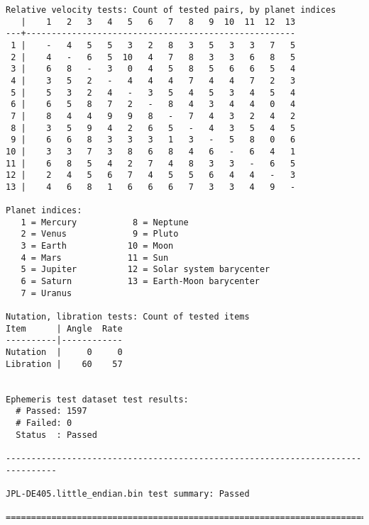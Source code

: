 \begin{description}
\begin{verbatim}
Relative velocity tests: Count of tested pairs, by planet indices
   |    1   2   3   4   5   6   7   8   9  10  11  12  13
---+-----------------------------------------------------
 1 |    -   4   5   5   3   2   8   3   5   3   3   7   5
 2 |    4   -   6   5  10   4   7   8   3   3   6   8   5
 3 |    6   8   -   3   0   4   5   8   5   6   6   5   4
 4 |    3   5   2   -   4   4   4   7   4   4   7   2   3
 5 |    5   3   2   4   -   3   5   4   5   3   4   5   4
 6 |    6   5   8   7   2   -   8   4   3   4   4   0   4
 7 |    8   4   4   9   9   8   -   7   4   3   2   4   2
 8 |    3   5   9   4   2   6   5   -   4   3   5   4   5
 9 |    6   6   8   3   3   3   1   3   -   5   8   0   6
10 |    3   3   7   3   8   6   8   4   6   -   6   4   1
11 |    6   8   5   4   2   7   4   8   3   3   -   6   5
12 |    2   4   5   6   7   4   5   5   6   4   4   -   3
13 |    4   6   8   1   6   6   6   7   3   3   4   9   -

Planet indices:
   1 = Mercury           8 = Neptune
   2 = Venus             9 = Pluto
   3 = Earth            10 = Moon
   4 = Mars             11 = Sun
   5 = Jupiter          12 = Solar system barycenter
   6 = Saturn           13 = Earth-Moon barycenter
   7 = Uranus

Nutation, libration tests: Count of tested items
Item      | Angle  Rate
----------|------------
Nutation  |     0     0
Libration |    60    57


Ephemeris test dataset test results:
  # Passed: 1597
  # Failed: 0
  Status  : Passed

--------------------------------------------------------------------------------

JPL-DE405.little_endian.bin test summary: Passed

================================================================================
\end{verbatim}

\end{description}

\newpage
